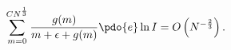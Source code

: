 \begin{equation}
\label{Eq_A39}
\sum^{CN^{\frac{1}{3}}}_{m=0}
  \frac{g(m)}{m + \epsilon + g(m)} \pdo{e} \ln I
  = O\left(N^{- \frac{2}{3}}\right).
\end{equation}

